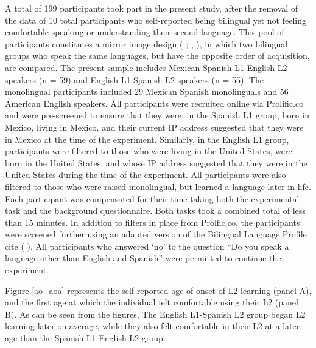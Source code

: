 \documentclass[preprints]{Definitions/mdpi}
\begin{document}
A total of 199 participants took part in the present study, after the removal of the data of 10 total participants who self-reported being bilingual yet not feeling comfortable speaking or understanding their second language.
This pool of participants constitutes a mirror image design (\citeauthor{rothman_typological_2010} \citeyear{rothman_typological_2010}; \citeauthor{leung_chapter_2009}, \citeyear{leung_chapter_2009}), in which two bilingual groups who speak the same languages, but have the opposite order of acquisition, are compared.
The present sample includes Mexican Spanish L1-English L2 speakers (n = 59) and English L1-Spanish L2 speakers (n = 55).
The monolingual participants included 29 Mexican Spanish monolinguals and 56 American English speakers.
All participants were recruited online via Prolific.co and were pre-screened to ensure that they were, in the Spanish L1 group, born in Mexico, living in Mexico, and their current IP address suggested that they were in Mexico at the time of the experiment.
Similarly, in the English L1 group, participants were filtered to those who were living in the United States, were born in the United States, and whose IP address suggested that they were in the United States during the time of the experiment.
All participants were also filtered to those who were raised monolingual, but learned a language later in life.
Each participant was compensated for their time taking both the experimental task and the background questionnaire.
Both tasks took a combined total of less than 15 minutes.
In addition to filters in place from Prolfic.co, the participants were screened further using an adapted version of the Bilingual Language Profile cite (\citeauthor{birdsong_bilingual_2012} \citeyear{birdsong_bilingual_2012}).
All participants who answered `no' to the question ``Do you speak a language other than English and Spanish'' were permitted to continue the experiment.

Figure \ref{ao_aoa} represents the self-reported age of onset of L2 learning (panel A), and the first age at which the individual felt comfortable using their L2 (panel B).
As can be seen from the figures, The English L1-Spanish L2 group began L2 learning later on average, while they also felt comfortable in their L2 at a later age than the Spanish L1-English L2 group.
\end{document}
